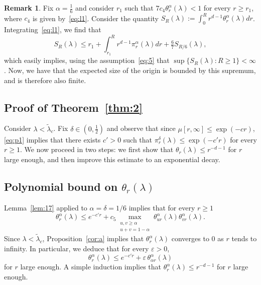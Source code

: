\documentclass[10pt]{amsart}
\theoremstyle{definition}\newtheorem{defi}[theo]{Definition}\newtheorem{rema}[theo]{Remark}\newtheorem{exam}[theo]{Example}\newtheorem{exem}[theo]{Example}\newtheorem{nota}[theo]{Notation}
\newcommand{\ep}{\varepsilon}
\begin{document}
\begin{rema}\label{rmk:finite}
Fix $\alpha=\tfrac16$ and consider $r_1$ such that $7c_4\theta_r^\alpha(\lambda)<1$ for every $r\ge r_1$, where $c_4$ is given by~\eqref{eq:l1}. Consider the quantity $S_R(\lambda):=\int_{0}^R r^{d-1}\theta^\alpha_r(\lambda)dr$. Integrating~\eqref{eq:l1}, we find that
\[
S_R(\lambda)\le r_1+\int_{r_1}^Rr^{d-1}\pi^\alpha_r(\lambda)dr +\tfrac67S_{R/6}(\lambda),
\]
which easily implies, using the assumption~\eqref{eq:5} that $\sup\{S_R(\lambda):R\ge1\}<\infty$. Now, we have that the expected size of the origin is bounded by this supremum, and is therefore also finite.
\end{rema}

\subsection{Proof of Theorem~\ref{thm:2}}\label{sec:4.2}


Consider $\lambda<\widetilde \lambda_c$. Fix $\delta\in(0,\tfrac12)$ and observe that since $\mu[r,\infty]\le \exp(-cr)$, \eqref{eq:p1} implies that there exists $c'>0$ such that $\pi_r^\delta(\lambda)\le \exp(-c' r)$ for every $r\ge1$. We now proceed in two steps: we first show that $\theta_r(\lambda)\le r^{-d-1}$ for $r$ large enough, and then improve this estimate to an exponential decay.

\subsection{Polynomial bound on $\theta_r(\lambda)$}
Lemma~\ref{lem:17} applied to $\alpha=\delta=1/6$ implies that for every $r\ge 1$
\begin{equation}\label{eq:6}
\theta_r^\alpha(\lambda) \le e^{-c' r}+c_5 \max_{\substack{u,v\ge\alpha \\ u+v=1-\alpha}}\theta_{ur}^\alpha(\lambda)\theta_{vr}^\alpha(\lambda).
\end{equation}
Since $\lambda<\widetilde \lambda_c$, Proposition~\ref{cor:a} implies that $\theta_r^\alpha(\lambda)$ converges to $0$ as $r$ tends to infinity. In particular, we deduce that for every $\ep>0$,
\[
\theta_r^\alpha(\lambda)\le e^{-c' r}+\ep\,\theta_{\alpha r}^\alpha(\lambda)
\]
for $r$ large enough. A simple induction implies that $\theta_r^\alpha(\lambda)\le r^{-d-1}$ for $r$ large enough.
\end{document}
